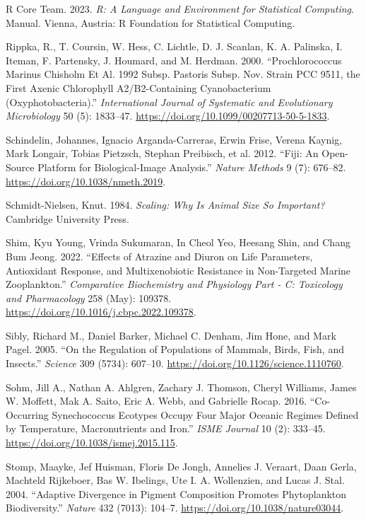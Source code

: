 \documentclass[
  letterpaper,
  DIV=11,
  numbers=noendperiod]{scrartcl}
\begin{document}
\begin{CSLReferences}
R Core Team. 2023. \emph{R: {A} Language and Environment for Statistical
Computing}. Manual. {Vienna, Austria}: {R Foundation for Statistical
Computing}.

Rippka, R., T. Coursin, W. Hess, C. Lichtle, D. J. Scanlan, K. A.
Palinska, I. Iteman, F. Partensky, J. Houmard, and M. Herdman. 2000.
{``Prochlorococcus Marinus {Chisholm} Et Al. 1992 Subsp. Pastoris Subsp.
Nov. Strain {PCC} 9511, the First Axenic Chlorophyll A2/B2-Containing
Cyanobacterium ({Oxyphotobacteria}).''} \emph{International Journal of
Systematic and Evolutionary Microbiology} 50 (5): 1833--47.
\url{https://doi.org/10.1099/00207713-50-5-1833}.

Schindelin, Johannes, Ignacio Arganda-Carreras, Erwin Frise, Verena
Kaynig, Mark Longair, Tobias Pietzsch, Stephan Preibisch, et al. 2012.
{``Fiji: {An} Open-Source Platform for Biological-Image Analysis.''}
\emph{Nature Methods} 9 (7): 676--82.
\url{https://doi.org/10.1038/nmeth.2019}.

Schmidt-Nielsen, Knut. 1984. \emph{Scaling: {Why} Is {Animal Size So
Important}?} {Cambridge University Press}.

Shim, Kyu Young, Vrinda Sukumaran, In Cheol Yeo, Heesang Shin, and Chang
Bum Jeong. 2022. {``Effects of Atrazine and Diuron on Life Parameters,
Antioxidant Response, and Multixenobiotic Resistance in Non-Targeted
Marine Zooplankton.''} \emph{Comparative Biochemistry and Physiology
Part - C: Toxicology and Pharmacology} 258 (May): 109378.
\url{https://doi.org/10.1016/j.cbpc.2022.109378}.

Sibly, Richard M., Daniel Barker, Michael C. Denham, Jim Hone, and Mark
Pagel. 2005. {``On the {Regulation} of {Populations} of {Mammals},
{Birds}, {Fish}, and {Insects}.''} \emph{Science} 309 (5734): 607--10.
\url{https://doi.org/10.1126/science.1110760}.

Sohm, Jill A., Nathan A. Ahlgren, Zachary J. Thomson, Cheryl Williams,
James W. Moffett, Mak A. Saito, Eric A. Webb, and Gabrielle Rocap. 2016.
{``Co-Occurring {Synechococcus} Ecotypes Occupy Four Major Oceanic
Regimes Defined by Temperature, Macronutrients and Iron.''} \emph{ISME
Journal} 10 (2): 333--45. \url{https://doi.org/10.1038/ismej.2015.115}.

Stomp, Maayke, Jef Huisman, Floris De Jongh, Annelies J. Veraart, Daan
Gerla, Machteld Rijkeboer, Bas W. Ibelings, Ute I. A. Wollenzien, and
Lucas J. Stal. 2004. {``Adaptive Divergence in Pigment Composition
Promotes Phytoplankton Biodiversity.''} \emph{Nature} 432 (7013):
104--7. \url{https://doi.org/10.1038/nature03044}.


\end{CSLReferences}
\end{document}
